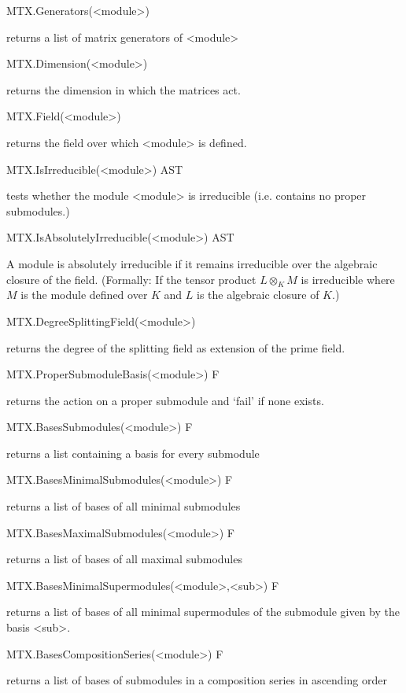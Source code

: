 \>MTX.Generators(<module>)

returns a list of matrix generators of <module>

\>MTX.Dimension(<module>)

returns the dimension in which the matrices act.

\>MTX.Field(<module>)

returns the field over which <module> is defined.


\>MTX.IsIrreducible(<module>) AST

tests whether the module <module> is irreducible (i.e. contains no proper
submodules.)

\>MTX.IsAbsolutelyIrreducible(<module>) AST

A module is absolutely irreducible if it remains irreducible over the
algebraic closure of the field. (Formally: If the tensor product $L\otimes_K
M$ is irreducible where $M$ is the module defined over $K$ and $L$ is the
algebraic closure of $K$.)

\>MTX.DegreeSplittingField(<module>)

returns the degree of the splitting field as extension of the prime field.


\>MTX.ProperSubmoduleBasis(<module>) F

returns the action on a proper submodule and `fail' if none exists.

\>MTX.BasesSubmodules(<module>) F

returns a list containing a basis for every submodule

\>MTX.BasesMinimalSubmodules(<module>) F

returns a list of bases of all minimal submodules

\>MTX.BasesMaximalSubmodules(<module>) F

returns a list of bases of all maximal submodules

\>MTX.BasesMinimalSupermodules(<module>,<sub>) F

returns a list of bases of all minimal supermodules of the submodule given by
the basis <sub>.

\>MTX.BasesCompositionSeries(<module>) F

returns a list of bases of submodules in a composition series in ascending
order

